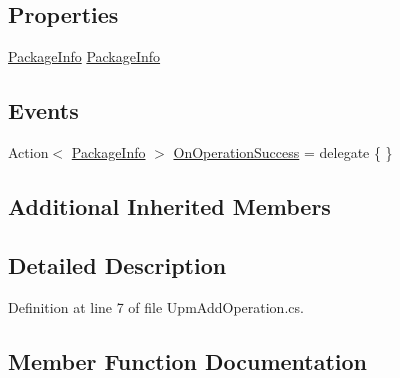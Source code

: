 \subsection*{Properties}
\begin{DoxyCompactItemize}
\item 
\mbox{\hyperlink{class_unity_editor_1_1_package_manager_1_1_u_i_1_1_package_info}{Package\+Info}} \mbox{\hyperlink{class_unity_editor_1_1_package_manager_1_1_u_i_1_1_upm_add_operation_a9ea676c65a0212e075b541ee3fd64c70}{Package\+Info}}
\end{DoxyCompactItemize}
\subsection*{Events}
\begin{DoxyCompactItemize}
\item 
Action$<$ \mbox{\hyperlink{class_unity_editor_1_1_package_manager_1_1_u_i_1_1_package_info}{Package\+Info}} $>$ \mbox{\hyperlink{class_unity_editor_1_1_package_manager_1_1_u_i_1_1_upm_add_operation_a291a66dd365a5e5afc3ab716b8e94288}{On\+Operation\+Success}} = delegate \{ \}
\end{DoxyCompactItemize}
\subsection*{Additional Inherited Members}


\subsection{Detailed Description}


Definition at line 7 of file Upm\+Add\+Operation.\+cs.



\subsection{Member Function Documentation}
\mbox{\label{class_unity_editor_1_1_package_manager_1_1_u_i_1_1_upm_add_operation_ae93614e9b995f7c8fcf0456c38be1cdd}} 
